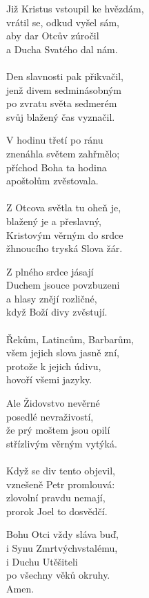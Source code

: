 \begin{translatioMulticol}{5}
Již Kristus vstoupil ke hvězdám,\\
vrátil se, odkud vyšel sám,\\
aby dar Otcův zúročil\\
a Ducha Svatého dal nám.\\
\vspace{-2mm}\\
Den slavnosti pak přikvačil,\\
jenž divem sedminásobným\\
po zvratu světa sedmerém\\
svůj blažený čas vyznačil.\columnbreak

V hodinu třetí po ránu\\
znenáhla světem zahřmělo;\\
příchod Boha ta hodina\\
apoštolům zvěstovala.\\
\vspace{-2mm}\\
Z Otcova světla tu oheň je,\\
blažený je a přeslavný,\\
Kristovým věrným do srdce\\
žhnoucího tryská Slova žár.\columnbreak

Z plného srdce jásají\\
Duchem jsouce povzbuzeni\\
a hlasy znějí rozličné,\\
když Boží divy zvěstují.\\
\vspace{-2mm}\\
Řekům, Latincům, Barbarům,\\
všem jejich slova jasně zní,\\
protože k jejich údivu,\\
hovoří všemi jazyky.\columnbreak

Ale Židovstvo nevěrné\\
posedlé nevraživostí,\\
že prý moštem jsou opilí\\
střízlivým věrným vytýká.\\
\vspace{-2mm}\\
Když se div tento objevil,\\
vznešeně Petr promlouvá:\\
zlovolní pravdu nemají,\\
prorok Joel to dosvědčí.\columnbreak

Bohu Otci vždy sláva buď,\\
i Synu Zmrtvýchvstalému,\\
i Duchu Utěšiteli\\
po všechny věků okruhy.\\
Amen.
\end{translatioMulticol}

